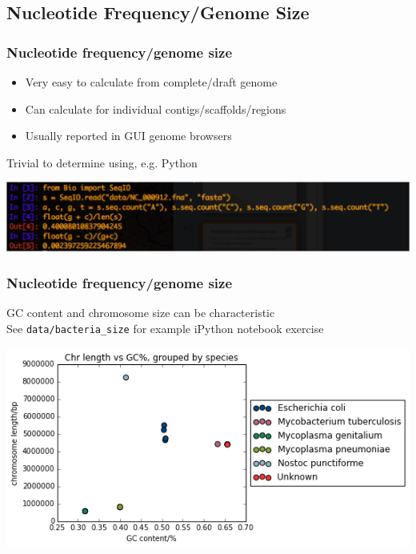
\subsection{Nucleotide Frequency/Genome Size}

\begin{frame}
  \frametitle{Nucleotide frequency/genome size}
  \begin{itemize}
    \item Very easy to calculate from complete/draft genome
    \item Can calculate for individual contigs/scaffolds/regions
    \item Usually reported in GUI genome browsers
  \end{itemize}    
  Trivial to determine using, e.g. Python
  \begin{center}
    \includegraphics[width=1\textwidth]{images/python_gc}
  \end{center}  
\end{frame}

\begin{frame}
  \frametitle{Nucleotide frequency/genome size}
  GC content and chromosome size can be characteristic\\
  See \texttt{data/bacteria\_size} for example iPython notebook exercise\\[0.5cm]
  \begin{center}
    \includegraphics[width=1\textwidth]{images/gc_vs_size}
  \end{center}  
\end{frame}

